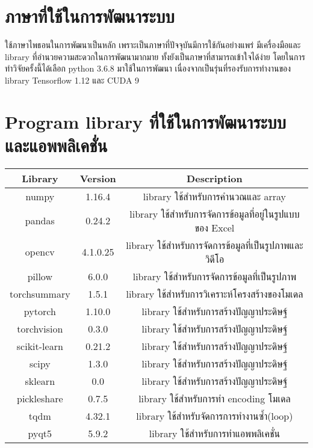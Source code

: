 \clearpage
\section{ภาษาที่ใช้ในการพัฒนาระบบ} 
	ใช้ภาษาไพธอนในการพัฒนาเป็นหลัก เพราะเป็นภาษาที่ปัจจุบันมีการใช้กันอย่างแพร่ มีเครื่องมือและ library ที่อำนวยความสะดวกในการพัฒนามากมาย 
	ทั้งยังเป็นภาษาที่สามารถเข้าใจได้ง่าย โดยในการทำวิจัยครั้งนี้ได้เลือก python 3.6.8 มาใช้ในการพัฒนา 
	เนื่องจากเป็นรุ่นที่รองรับการทำงานของ library Tensorflow 1.12 และ CUDA 9
\vspace{3mm}
\section{Program library ที่ใช้ในการพัฒนาระบบและแอพพลิเคชั่น} 
\begin{tabular}{|c|c|c|}
		\hline
		{Library}&{Version}&{Description}\\
		\hline
		numpy	 			& 1.16.4		& library ใช้สำหรับการคำนวณและ array			\\
		pandas				& 0.24.2		& library ใช้สำหรับการจัดการข้อมูลที่อยู่ในรูปแบบของ Excel				\\
		opencv			 	& 4.1.0.25		& library ใช้สำหรับการจัดการข้อมูลที่เป็นรูปภาพและวิดีโอ		\\
		pillow				& 6.0.0			& library ใช้สำหรับการจัดการข้อมูลที่เป็นรูปภาพ			\\
		torchsummary		& 1.5.1			& library ใช้สำหรับการวิเคราะห์โครงสร้างของโมเดล 							\\
		pytorch		 		& 1.10.0		& library ใช้สำหรับการสร้างปัญญาประดิษฐ์							\\
		torchvision			& 0.3.0	 		& library ใช้สำหรับการสร้างปัญญาประดิษฐ์							\\
		scikit-learn		& 0.21.2		& library ใช้สำหรับการสร้างปัญญาประดิษฐ์							\\
		scipy				& 1.3.0			& library ใช้สำหรับการสร้างปัญญาประดิษฐ์							\\
		sklearn				& 0.0			& library ใช้สำหรับการสร้างปัญญาประดิษฐ์							\\
		pickleshare			& 0.7.5			& library ใช้สำหรับการทำ encoding โมเดล				\\
		tqdm				& 4.32.1		& library ใช้สำหรับจัดการการทำงานซ้ำ(loop)					\\
		pyqt5				& 5.9.2			& library ใช้สำหรับการทำแอพพลิเคชั่น					\\
		\hline
\end{tabular}

\vspace{3mm}

